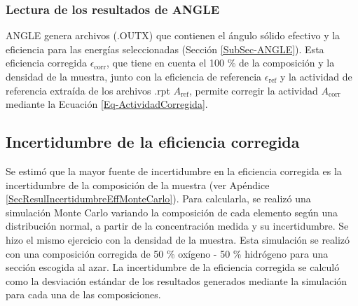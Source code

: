 \subsubsection{Lectura de los resultados de ANGLE}
ANGLE genera archivos (.OUTX) que contienen el ángulo sólido efectivo y la eficiencia para las energías seleccionadas (Sección \ref{SubSec-ANGLE}). Esta eficiencia corregida $\epsilon_\text{corr}$, que tiene en cuenta el 100 \% de la composición y la densidad de la muestra, junto con la eficiencia de referencia $\epsilon_\text{ref}$ y la actividad de referencia extraída de los archivos .rpt $A_\text{ref}$, permite corregir la actividad $A_\text{corr}$ mediante la Ecuación \ref{Eq-ActividadCorregida}.
\subsection[Incertidumbre de eficiencia corregida ]{Incertidumbre de la eficiencia corregida}\label{SubSec-IncertidumbreEffMonteCarlo}
Se estimó que la mayor fuente de incertidumbre en la eficiencia corregida es la incertidumbre de la composición de la muestra (ver Apéndice \ref{SecResulIncertidumbreEffMonteCarlo}). Para calcularla, se realizó una simulación Monte Carlo variando la composición de cada elemento según una distribución normal, a partir de la concentración medida y su incertidumbre. Se hizo el mismo ejercicio con la densidad de la muestra. Esta simulación se realizó con una composición corregida de 50 \% oxígeno - 50 \% hidrógeno para una sección escogida al azar. La incertidumbre de la eficiencia corregida se calculó como la desviación estándar de los resultados generados mediante la simulación para cada una de las composiciones. 
